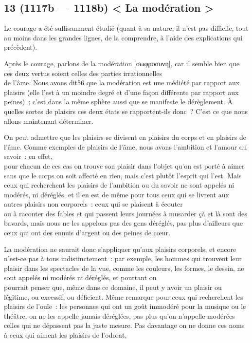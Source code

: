 \documentclass[french,twoside]{book} %
\begin{document}
\subsection[{13 (1117b — 1118b) < La modération >}]{13 (1117b — 1118b) < La modération >}
\noindent Le courage a été suffisamment étudié (quant à sa nature, il n’est pas difficile, tout au moins dans les grandes lignes, de la comprendre, à l’aide des explications qui précèdent).\par
Après le courage, parlons de la modération [σωφροσυνη], car il semble bien que ces deux vertus soient celles des parties irrationnelles \\
de l’âme. Nous avons dit56 que la modération est une médiété par rapport aux plaisirs (elle l’est à un moindre degré et d’une façon différente par rapport aux peines) ; c’est dans la même sphère aussi que se manifeste le dérèglement. À quelles sortes de plaisirs ces deux états se rapportent-ils donc ? C’est ce que nous allons maintenant déterminer.\par
On peut admettre que les plaisirs se divisent en plaisirs du corps et en plaisirs de l’âme. Comme exemples de plaisirs de l’âme, nous avons l’ambition et l’amour du savoir : en effet, \\
pour chacun de ces cas on trouve son plaisir dans l’objet qu’on est porté à aimer sans que le corps on soit affecté en rien, mais c’est plutôt l’esprit qui l’est. Mais ceux qui recherchent les plaisirs de l’ambition ou du savoir ne sont appelés ni modérés, ni déréglés, et il en est de même pour tous ceux qui se livrent aux autres plaisirs non corporels : ceux qui se plaisent à écouter \\
ou à raconter des fables et qui passent leurs journées à musarder çà et là sont des bavards, mais nous ne les appelons pas des  gens déréglés, pas plus d’ailleurs que ceux qui ont des ennuis d’argent ou des peines de cœur.\par
La modération ne saurait donc s’appliquer qu’aux plaisirs corporels, et encore n’est-ce pas à tous indistinctement : par exemple, les hommes qui trouvent leur plaisir dans les spectacles de la vue, comme les couleurs, les formes, le dessin, ne sont appelés ni modérés ni déréglés, et pourtant on \\
pourrait penser que, même dans ce domaine, il peut y avoir un plaisir ou légitime, ou excessif, ou déficient. Même remarque pour ceux qui recherchent les plaisirs de l’ouïe : les personnes qui ont un goût immodéré pour la musique ou le théâtre, on ne les appelle jamais déréglées, pas plus qu’on n’appelle modérées celles qui ne dépassent pas la juste mesure. Pas davantage on ne donne ces noms à ceux qui aiment les plaisirs de l’odorat, \\
\end{document}
